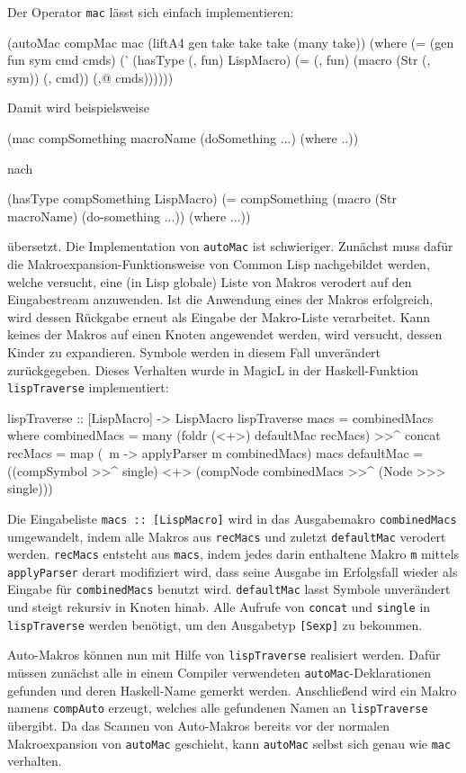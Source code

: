 \documentclass[11pt, a4paper, bibgerm]{scrbook}
\newcommand\icode[1]{\lstinline?#1?}
\begin{document}
Der Operator \icode{mac} lässt sich einfach implementieren:
\begin{code}
(autoMac compMac mac
  (liftA4 gen take take take (many take))
  (where (= (gen fun sym cmd cmds)
            (' (hasType (, fun) LispMacro)
               (= (, fun) (macro (Str (, sym)) (, cmd)) (,@ cmds))))))  
\end{code}
Damit wird beispielsweise 
\begin{code}
(mac compSomething macroName 
    (doSomething ...) 
  (where ..))
\end{code}
nach
\begin{code}
(hasType compSomething LispMacro)
(= compSomething (macro (Str macroName)
                   (do-something ...))
  (where ...))
\end{code}
übersetzt. Die Implementation von \icode{autoMac} ist
schwieriger. Zunächst muss dafür die Makroexpansion-Funktionsweise von
Common Lisp nachgebildet werden, welche versucht, eine (in Lisp
globale) Liste von Makros verodert auf den Eingabestream anzuwenden. Ist
die Anwendung eines der Makros erfolgreich, wird dessen Rückgabe erneut
als Eingabe der Makro-Liste verarbeitet. Kann keines der Makros auf einen
Knoten angewendet werden, wird versucht, dessen Kinder zu
expandieren. Symbole werden in diesem Fall unverändert
zurückgegeben. Dieses Verhalten wurde in MagicL in der Haskell-Funktion
\icode{lispTraverse} implementiert:
\begin{code}
lispTraverse :: [LispMacro] -> LispMacro
lispTraverse macs = combinedMacs
  where combinedMacs = many (foldr (<+>) defaultMac recMacs) >>^ concat
        recMacs      = map (\ m -> applyParser m combinedMacs) macs
        defaultMac   = ((compSymbol >>^ single) <+> 
                        (compNode combinedMacs >>^ (Node >>> single)))  
\end{code}
Die Eingabeliste \icode{macs :: [LispMacro]} wird in das Ausgabemakro
\icode{combinedMacs} umgewandelt, indem alle Makros aus \icode{recMacs}
und zuletzt \icode{defaultMac} verodert werden. \icode{recMacs} entsteht
aus \icode{macs}, indem jedes darin enthaltene Makro \icode{m} mittels
\icode{applyParser} derart modifiziert wird, dass seine Ausgabe im
Erfolgsfall wieder als Eingabe für \icode{combinedMacs} benutzt
wird. \icode{defaultMac} lasst Symbole unverändert und steigt rekursiv
in Knoten hinab. Alle Aufrufe von \icode{concat} und \icode{single} in
\icode{lispTraverse} werden benötigt, um den Ausgabetyp \icode{[Sexp]}
zu bekommen.

Auto-Makros können nun mit Hilfe von \icode{lispTraverse} realisiert
werden. Dafür müssen zunächst alle in einem Compiler verwendeten
\icode{autoMac}-Deklarationen gefunden und deren Haskell-Name gemerkt
werden. Anschließend wird ein Makro namens \icode{compAuto} erzeugt,
welches alle gefundenen Namen an \icode{lispTraverse}
übergibt. Da das Scannen von Auto-Makros bereits vor der
normalen Makroexpansion von \icode{autoMac} geschieht, kann
\icode{autoMac} selbst sich genau wie \icode{mac} verhalten.
\end{document}
